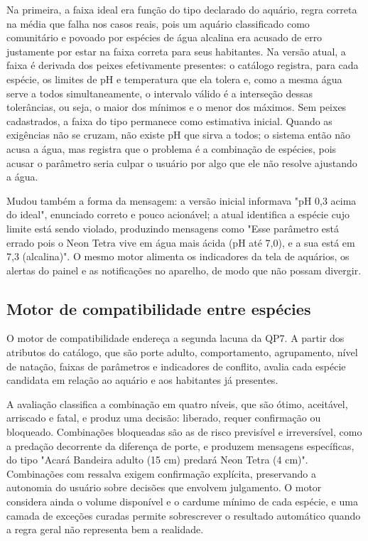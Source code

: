 \documentclass[12pt,oneside,a4paper,brazilian]{abntex2}
\begin{document}
Na primeira, a faixa ideal era função do tipo declarado do aquário, regra correta na média que falha nos casos reais, pois um aquário classificado como comunitário e povoado por espécies de água alcalina era acusado de erro justamente por estar na faixa correta para seus habitantes. Na versão atual, a faixa é derivada dos peixes efetivamente presentes: o catálogo registra, para cada espécie, os limites de pH e temperatura que ela tolera e, como a mesma água serve a todos simultaneamente, o intervalo válido é a interseção dessas tolerâncias, ou seja, o maior dos mínimos e o menor dos máximos. Sem peixes cadastrados, a faixa do tipo permanece como estimativa inicial. Quando as exigências não se cruzam, não existe pH que sirva a todos; o sistema então não acusa a água, mas registra que o problema é a combinação de espécies, pois acusar o parâmetro seria culpar o usuário por algo que ele não resolve ajustando a água.

Mudou também a forma da mensagem: a versão inicial informava "pH 0,3 acima do ideal", enunciado correto e pouco acionável; a atual identifica a espécie cujo limite está sendo violado, produzindo mensagens como "Esse parâmetro está errado pois o Neon Tetra vive em água mais ácida (pH até 7,0), e a sua está em 7,3 (alcalina)". O mesmo motor alimenta os indicadores da tela de aquários, os alertas do painel e as notificações no aparelho, de modo que não possam divergir.


\subsection{Motor de compatibilidade entre espécies}
O motor de compatibilidade endereça a segunda lacuna da QP7. A partir dos atributos do catálogo, que são porte adulto, comportamento, agrupamento, nível de natação, faixas de parâmetros e indicadores de conflito, avalia cada espécie candidata em relação ao aquário e aos habitantes já presentes.

A avaliação classifica a combinação em quatro níveis, que são ótimo, aceitável, arriscado e fatal, e produz uma decisão: liberado, requer confirmação ou bloqueado. Combinações bloqueadas são as de risco previsível e irreversível, como a predação decorrente da diferença de porte, e produzem mensagens específicas, do tipo "Acará Bandeira adulto (15 cm) predará Neon Tetra (4 cm)". Combinações com ressalva exigem confirmação explícita, preservando a autonomia do usuário sobre decisões que envolvem julgamento. O motor considera ainda o volume disponível e o cardume mínimo de cada espécie, e uma camada de exceções curadas permite sobrescrever o resultado automático quando a regra geral não representa bem a realidade.
\end{document}
